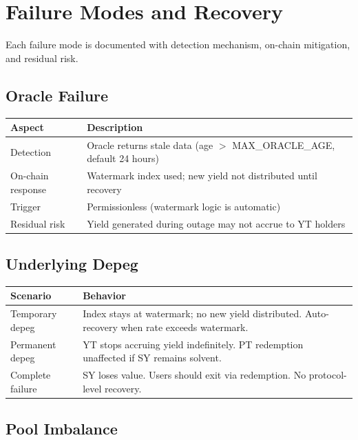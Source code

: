 \section{Failure Modes and Recovery}

Each failure mode is documented with detection mechanism, on-chain mitigation, and residual risk.

\subsection{Oracle Failure}

\begin{center}
\begin{tabularx}{\textwidth}{l >{\raggedright\arraybackslash}X}
\toprule
\textbf{Aspect} & \textbf{Description} \\
\midrule
Detection & Oracle returns stale data (age $>$ MAX\_ORACLE\_AGE, default 24 hours) \\
On-chain response & Watermark index used; new yield not distributed until recovery \\
Trigger & Permissionless (watermark logic is automatic) \\
Residual risk & Yield generated during outage may not accrue to YT holders \\
\bottomrule
\end{tabularx}
\end{center}

\subsection{Underlying Depeg}

\begin{center}
\begin{tabularx}{\textwidth}{l >{\raggedright\arraybackslash}X}
\toprule
\textbf{Scenario} & \textbf{Behavior} \\
\midrule
Temporary depeg & Index stays at watermark; no new yield distributed. Auto-recovery when rate exceeds watermark. \\
Permanent depeg & YT stops accruing yield indefinitely. PT redemption unaffected if SY remains solvent. \\
Complete failure & SY loses value. Users should exit via redemption. No protocol-level recovery. \\
\bottomrule
\end{tabularx}
\end{center}

\subsection{Pool Imbalance}

